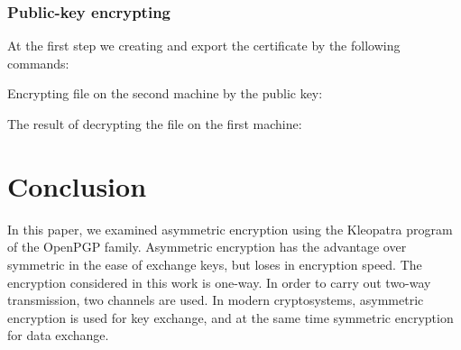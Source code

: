 \documentclass[14pt,a4paper,report]{report}
\begin{document}


\subsubsection{Public-key encrypting}

At the first step we creating and export the certificate by the following commands:



Encrypting file on the second machine by the public key:



The result of decrypting the file on the first machine:



\section{Conclusion}

In this paper, we examined asymmetric encryption using the Kleopatra program of the OpenPGP family. Asymmetric encryption has the advantage over symmetric in the ease of exchange keys, but loses in encryption speed. The encryption considered in this work is one-way. In order to carry out two-way transmission, two channels are used. In modern cryptosystems, asymmetric encryption is used for key exchange, and at the same time symmetric encryption for data exchange.
\end{document}
